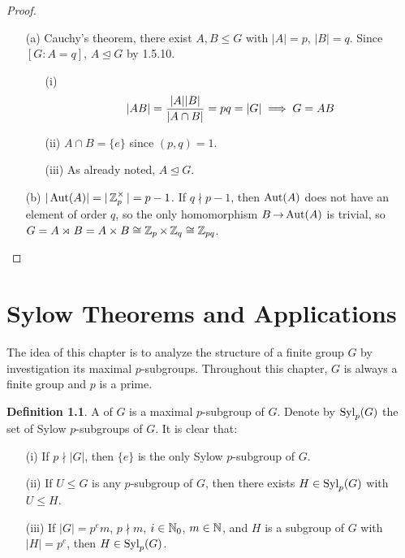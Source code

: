 \documentclass[11pt]{book}
\theoremstyle{definition}   \newtheorem{defn}[counter]{Definition} %
\newcommand{\nsg}{\mathrel{\unlhd}}   \newcommand{\ind}{\parindent24pt}   \newcommand{\vn}{\varnothing}
\DeclareMathOperator{\ra}{\rightarrow}   \DeclareMathOperator{\Poly}{\mathbf{P}}   \DeclareMathOperator{\spn}{\textnormal{span}}   \DeclareMathOperator{\aut}{\textnormal{Aut}}
\newcommand{\vs}{\vspace{8pt}}
\numberwithin{counter}{chapter}
\begin{document}
\begin{proof}
\
\begin{enumerate}
\item[(a)] Cauchy's theorem, there exist $A,B \leq G$ with $|A| = p$, $|B| = q$. Since $[G : A = q]$, $A \nsg G$ by 1.5.10.
	\begin{enumerate}
	\item[(i)] \[\left| AB \right| = \frac{|A||B|}{|A\cap B|} = pq = |G| \implies G = AB\]
	\item[(ii)] $A \cap B = \{e\}$ since $(p,q) = 1$.
	\item[(iii)] As already noted, $A \nsg G$.
	\end{enumerate}

\item[(b)] $|\aut(A)| = |\z_p\x| = p-1$. If $q \nmid p-1$, then $\aut(A)$ does not have an element of order $q$, so the only homomorphism $B \ra \aut(A)$ is trivial, so $G = A \rtimes_{}B = A \times B \cong \operatorname{\mathbb{Z}}_p \times \operatorname{\mathbb{Z}}_q \cong \operatorname{\mathbb{Z}}_{pq}$.
\end{enumerate}
\end{proof}

\vs

\chapter{Sylow Theorems and Applications}



The idea of this chapter is to analyze the structure of a finite group $G$ by investigation its maximal $p$-subgroups. Throughout this chapter, $G$ is always a finite group and $p$ is a prime.

\vs

\begin{defn}
A  of $G$ is a maximal $p$-subgroup of $G$. Denote by $\textnormal{Syl}_p(G)$ the set of Sylow $p$-subgroups of $G$. It is clear that:
	\begin{enumerate}
	\item[(i)] If $p \nmid |G|$, then $\{e\}$ is the only Sylow $p$-subgroup of $G$.
	\item[(ii)] If $U \leq G$ is any $p$-subgroup of $G$, then there exists $H \in \textnormal{Syl}_p(G)$ with $U \leq H$.
	\item[(iii)] If $|G| = p^em$, $p \nmid m$, $i \in \operatorname{\mathbb{N}}_0$, $m \in \operatorname{\mathbb{N}}$, and $H$ is a subgroup of $G$ with $|H| = p^e$, then $H \in \textnormal{Syl}_p(G)$.
	\end{enumerate}
\end{defn}
\end{document}
